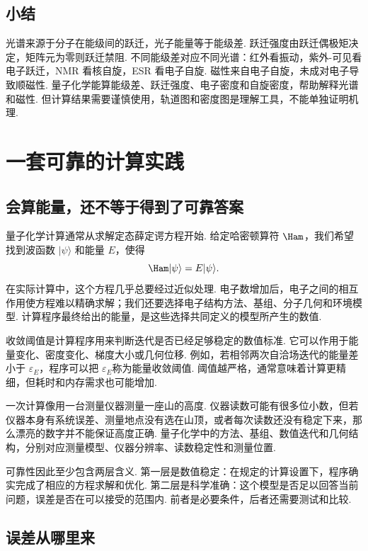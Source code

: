 \documentclass[UTF8,11pt,a4paper,openany]{ctexbook}
\newcommand{\ket}[1]{\lvert #1\rangle}\newcommand{\bra}[1]{\langle #1\rvert}
\begin{document}
\section{小结}

光谱来源于分子在能级间的跃迁，光子能量等于能级差. 跃迁强度由跃迁偶极矩决定，矩阵元为零则跃迁禁阻. 不同能级差对应不同光谱：红外看振动，紫外-可见看电子跃迁，NMR 看核自旋，ESR 看电子自旋. 磁性来自电子自旋，未成对电子导致顺磁性. 量子化学能算能级差、跃迁强度、电子密度和自旋密度，帮助解释光谱和磁性. 但计算结果需要谨慎使用，轨道图和密度图是理解工具，不能单独证明机理. 
\chapter{一套可靠的计算实践}

\section{会算能量，还不等于得到了可靠答案}

量子化学计算通常从求解定态薛定谔方程开始. 给定哈密顿算符 $\Ham$，我们希望找到波函数 $\ket\psi$ 和能量 $E$，使得
\[
\Ham\ket\psi=E\ket\psi.
\]
在实际计算中，这个方程几乎总要经过近似处理. 电子数增加后，电子之间的相互作用使方程难以精确求解；我们还要选择电子结构方法、基组、分子几何和环境模型. 计算程序最终给出的能量，是这些选择共同定义的模型所产生的数值. 

\begin{notationbox}
收敛阈值是计算程序用来判断迭代是否已经足够稳定的数值标准. 它可以作用于能量变化、密度变化、梯度大小或几何位移. 例如，若相邻两次自洽场迭代的能量差小于 $\varepsilon_E$，程序可以把 $\varepsilon_E$称为能量收敛阈值. 阈值越严格，通常意味着计算更精细，但耗时和内存需求也可能增加. 
\end{notationbox}

\begin{analogybox}
一次计算像用一台测量仪器测量一座山的高度. 仪器读数可能有很多位小数，但若仪器本身有系统误差、测量地点没有选在山顶，或者每次读数还没有稳定下来，那么漂亮的数字并不能保证高度正确. 量子化学中的方法、基组、数值迭代和几何结构，分别对应测量模型、仪器分辨率、读数稳定性和测量位置. 
\end{analogybox}

可靠性因此至少包含两层含义. 第一层是数值稳定：在规定的计算设置下，程序确实完成了相应的方程求解和优化. 第二层是科学准确：这个模型是否足以回答当前问题，误差是否在可以接受的范围内. 前者是必要条件，后者还需要测试和比较. 

\section{误差从哪里来}
\end{document}
